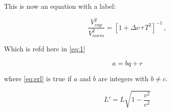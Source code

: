 This is now an equation with a label:

\begin{equation}
\label{eq:1}
\frac{V_{ sup}^2}{V_{ norm}^2} = [1 + \Delta \nu \, \tau \, T^2 ]^{-1} \, ,
\end{equation}

Which is refd here in \ref{eq:1}

\begin{equation} \label{eq:erl}
a = bq + r
\end{equation}

where \eqref{eq:erl} is true if $a$ and $b$ are integers with $b \neq c$.

\begin{equation}

  L' = {L}{\sqrt{1-\frac{v^2}{c^2}}}
 \end{equation}
